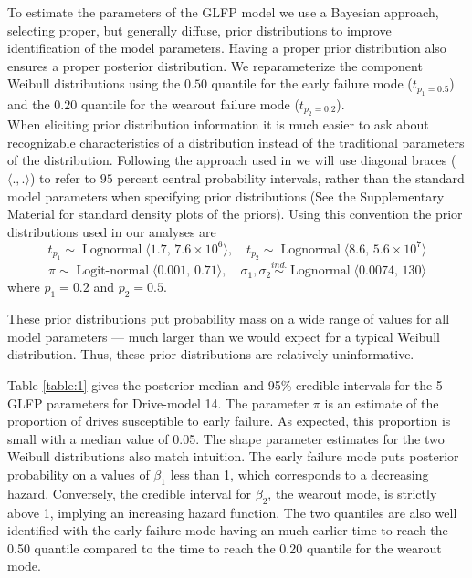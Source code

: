 \documentclass[11pt]{article}
\newcommand{\op}{\operatorname}
\begin{document}
To estimate the parameters of the GLFP model we use a Bayesian approach, selecting proper, but generally diffuse, prior distributions to improve identification of the model parameters. Having a proper prior distribution also ensures a proper posterior distribution. We reparameterize the component Weibull distributions using the $0.50$ quantile for the early failure mode ($t_{p_1=0.5}$) and the $0.20$ quantile for the wearout failure mode ($t_{p_2=0.2}$). \\

When eliciting prior distribution information it is much easier to ask about recognizable characteristics of a distribution instead of the traditional parameters of the distribution.  Following the approach used in \cite[Section 15.2.2]{intervals} we will use diagonal braces ($\langle.,.\rangle$) to refer to $95$ percent central probability intervals, rather than the standard model parameters when specifying prior distributions (See the Supplementary Material for standard density plots of the priors).  Using this convention the prior distributions used in our analyses are
$$t_{p_1} \sim \op{Lognormal} \langle 1.7,\,7.6\times 10^6 \rangle,\quad
t_{p_2} \sim \op{Lognormal}\langle 8.6, \, 5.6\times 10^7 \rangle$$
$$\pi \sim \op{Logit-normal}\langle 0.001,\, 0.71 \rangle,\quad
\sigma_1, \sigma_2 \stackrel{ind.}{\sim} \op{Lognormal}\langle 0.0074 ,\,130 \rangle$$
where $p_1=0.2$ and $p_2=0.5$.

\noindent These prior distributions put probability mass on a wide range of values for all model parameters --- much larger than we would expect for a typical Weibull distribution.  Thus, these prior distributions are relatively uninformative. 


Table \ref{table:1} gives the posterior median and 95\% credible intervals for the 5 GLFP parameters for Drive-model 14.  The parameter $\pi$ is an estimate of the proportion of drives susceptible to early failure.  As expected, this proportion is small with a median value of 0.05.  The shape parameter estimates for the two Weibull distributions also match intuition.  The early failure mode puts posterior probability on a values of $\beta_1$ less than 1, which corresponds to a decreasing hazard.  Conversely, the credible interval for $\beta_2$, the wearout mode, is strictly above 1, implying an increasing hazard function.  The two quantiles are also well identified with the early failure mode having an much earlier time to reach the 0.50 quantile compared to the time to reach the 0.20 quantile for the wearout mode. 
\end{document}
